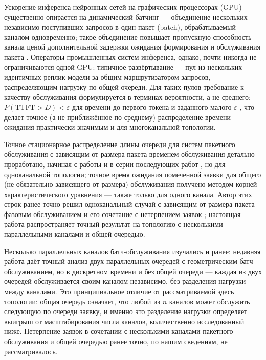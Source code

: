 \documentclass[12pt,a4paper]{article}
\newcommand{\articlesection}[1]{\par\vspace{14pt}{\bfseries #1}\par\vspace{6pt}\nopagebreak}
\begin{document}
\renewcommand{\figurename}{Рисунок}
\renewcommand{\tablename}{Таблица}

\articlesection{Введение}

Ускорение инференса нейронных сетей на графических процессорах (GPU) существенно опирается на динамический батчинг --- объединение нескольких независимо поступивших запросов в один пакет (batch), обрабатываемый каналом одновременно; такое объединение повышает пропускную способность канала ценой дополнительной задержки ожидания формирования и обслуживания пакета \cite{inoue2021}. Операторы промышленных систем инференса, однако, почти никогда не ограничиваются одной GPU: типичное развёртывание --- пул из нескольких идентичных реплик модели за общим маршрутизатором запросов, распределяющим нагрузку по общей очереди. Для таких пулов требование к качеству обслуживания формулируется в терминах вероятности, а не среднего: $P(\mathrm{TTFT}>D)<\varepsilon$ для времени до первого токена и заданного малого $\varepsilon$ \cite{quartz2026,jitserve2026}, что делает точное (а не приближённое по среднему) распределение времени ожидания практически значимым и для многоканальной топологии.

Точное стационарное распределение длины очереди для систем пакетного обслуживания с зависящим от размера пакета временем обслуживания детально проработано, начиная с работы \cite{banerjee2012} и в серии последующих работ \cite{pradhan2016,banerjee2015,gupta2018,pradhan2024}, но для одноканальной топологии; точное время ожидания помеченной заявки для общего (не обязательно зависящего от размера) обслуживания получено методом корней характеристического уравнения \cite{chaudhry2023} --- также только для одного канала. Автор этих строк ранее точно решил одноканальный случай с зависящим от размера пакета фазовым обслуживанием и его сочетание с нетерпением заявок \cite{khabarovsingle2026}; настоящая работа распространяет точный результат на топологию с несколькими параллельными каналами и общей очередью.

Несколько параллельных каналов батч-обслуживания изучались и ранее: недавняя работа \cite{bruneel2026} даёт точный анализ двух параллельных очередей с геометрическим батч-обслуживанием, но в дискретном времени и без общей очереди --- каждая из двух очередей обслуживается своим каналом независимо, без разделения нагрузки между каналами. Это принципиальное отличие от рассматриваемой здесь топологии: общая очередь означает, что любой из $n$ каналов может обслужить следующую по очереди заявку, и именно это разделение нагрузки определяет выигрыш от масштабирования числа каналов, количественно исследованный ниже. Нетерпение заявок в сочетании с несколькими каналами пакетного обслуживания и общей очередью ранее точно, по нашим сведениям, не рассматривалось.
\end{document}
